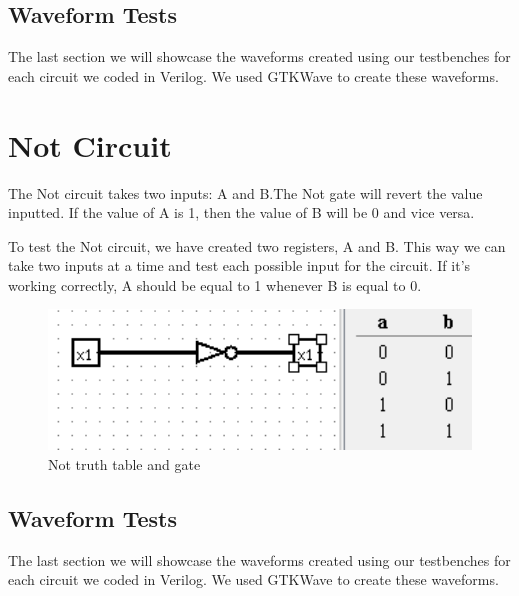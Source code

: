 \documentclass[12pt]{article}
\begin{document}
\newpage

\subsection{Waveform Tests}

The last section we will showcase the waveforms created using our testbenches for each circuit we coded in Verilog. We used GTKWave to create these waveforms.









\section{Not Circuit}
The Not circuit takes two inputs: A and B.The Not gate will revert the value inputted. If the value of A is 1, then the value of B will be 0 and vice versa.


To test the Not circuit, we have created two registers, A and B. This way we can take two inputs at a time and test each possible input for the circuit. If it's working correctly, A should be equal to 1 whenever B is equal to 0.


\begin{figure}[h]
    \centering
    \includegraphics[width = 1.0\textwidth]{figs/Not CircuitTruth.png}
    \caption{Not truth table and gate}
    \label{fig:enter-label}
\end{figure}

\newpage



\subsection{Waveform Tests}

The last section we will showcase the waveforms created using our testbenches for each circuit we coded in Verilog. We used GTKWave to create these waveforms.
\end{document}
